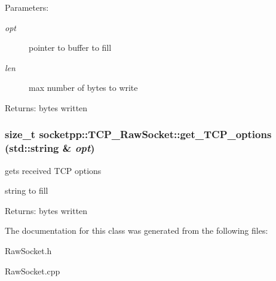 \begin{Desc}
\item[Parameters:]
\begin{description}
\item[{\em opt}]pointer to buffer to fill \item[{\em len}]max number of bytes to write \end{description}
\end{Desc}
\begin{Desc}
\item[Returns:]bytes written \end{Desc}
\hypertarget{classsocketpp_1_1TCP__RawSocket_67ab79f764a710067590427cb35aeea0}{
\subsubsection{\setlength{\rightskip}{0pt plus 5cm}size\_\-t socketpp::TCP\_\-RawSocket::get\_\-TCP\_\-options (std::string \& {\em opt})}}
\label{classsocketpp_1_1TCP__RawSocket_67ab79f764a710067590427cb35aeea0}


gets received TCP options 

string to fill \begin{Desc}
\item[Returns:]bytes written \end{Desc}


The documentation for this class was generated from the following files:\begin{CompactItemize}
\item 
RawSocket.h\item 
RawSocket.cpp\end{CompactItemize}
